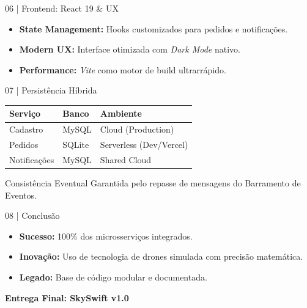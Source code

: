 \documentclass[aspectratio=169,12pt]{beamer}
\begin{document}
\begin{frame}{06 | Frontend: React 19 \& UX}
  \begin{itemize}
    \item \textbf{State Management:} Hooks customizados para pedidos e notificações.
    \item \textbf{Modern UX:} Interface otimizada com \textit{Dark Mode} nativo.
    \item \textbf{Performance:} \textit{Vite} como motor de build ultrarrápido.
  \end{itemize}
  \vfill
  \centering
\end{frame}

\begin{frame}{07 | Persistência Híbrida}
  \centering
  \begin{tabular}{l l l}
    \toprule
    \textbf{Serviço} & \textbf{Banco} & \textbf{Ambiente} \\
    \midrule
    Cadastro & MySQL & Cloud (Production) \\
    Pedidos & SQLite & Serverless (Dev/Vercel) \\
    Notificações & MySQL & Shared Cloud \\
    \bottomrule
  \end{tabular}
  \vfill
  \begin{block}{Consistência Eventual}
    Garantida pelo repasse de mensagens do Barramento de Eventos.
  \end{block}
\end{frame}

\begin{frame}{08 | Conclusão}
  \begin{itemize}
    \item \textbf{Sucesso:} 100\% dos microsserviços integrados.
    \item \textbf{Inovação:} Uso de tecnologia de drones simulada com precisão matemática.
    \item \textbf{Legado:} Base de código modular e documentada.
  \end{itemize}
  \vfill
  \centering
  \textcolor{AccentBlue}{\huge \textbf{Entrega Final: SkySwift v1.0}}
\end{frame}
\end{document}
